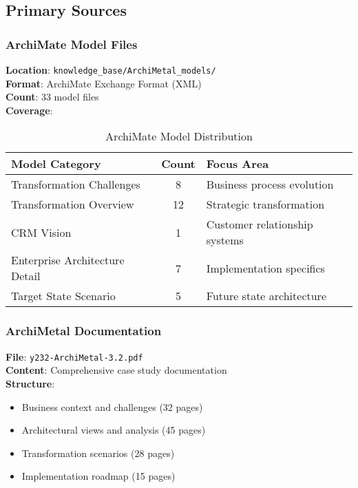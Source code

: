 \documentclass[12pt,a4paper]{article}
\begin{document}
\subsection{Primary Sources}

\subsubsection{ArchiMate Model Files}
\textbf{Location}: \texttt{knowledge\_base/ArchiMetal\_models/}\\
\textbf{Format}: ArchiMate Exchange Format (XML)\\
\textbf{Count}: 33 model files\\
\textbf{Coverage}:

\begin{table}[h]
\centering
\begin{tabular}{|l|c|l|}
\hline
\textbf{Model Category} & \textbf{Count} & \textbf{Focus Area} \\
\hline
Transformation Challenges & 8 & Business process evolution \\
Transformation Overview & 12 & Strategic transformation \\
CRM Vision & 1 & Customer relationship systems \\
Enterprise Architecture Detail & 7 & Implementation specifics \\
Target State Scenario & 5 & Future state architecture \\
\hline
\end{tabular}
\caption{ArchiMate Model Distribution}
\end{table}

\subsubsection{ArchiMetal Documentation}
\textbf{File}: \texttt{y232-ArchiMetal-3.2.pdf}\\
\textbf{Content}: Comprehensive case study documentation\\
\textbf{Structure}:
\begin{itemize}
    \item Business context and challenges (32 pages)
    \item Architectural views and analysis (45 pages)
    \item Transformation scenarios (28 pages)
    \item Implementation roadmap (15 pages)
\end{itemize}
\end{document}
